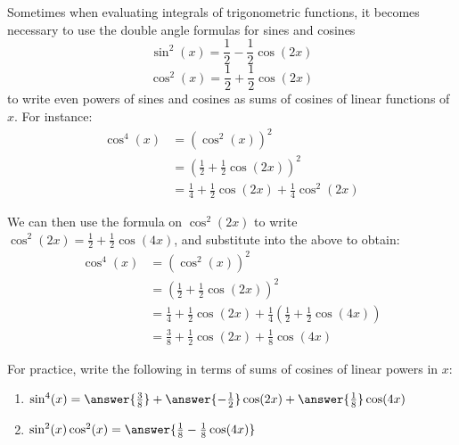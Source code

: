 \documentclass{ximera}
\begin{document}
\begin{exercise}
\begin{problem}

  Sometimes when evaluating integrals of trigonometric functions, it becomes necessary to use the double angle formulas for sines and cosines
  \[
    \sin^2(x) = \frac{1}{2} - \frac{1}{2}\cos(2x)
  \]
  \[
    \cos^2(x) = \frac{1}{2} + \frac{1}{2}\cos(2x)
  \]
  to write even powers of sines and cosines as sums of cosines of linear functions of $x$.
  For instance:
  \begin{align*}
    \cos^4(x) &= (\cos^2(x))^2 \\
    &= \left(\frac{1}{2} + \frac{1}{2}\cos(2x)\right)^2 \\
    &= \frac{1}{4} + \frac{1}{2}\cos(2x) + \frac{1}{4}\cos^2(2x)
  \end{align*}
  
  We can then use the formula on $\cos^2(2x)$ to write $\cos^2(2x) = \frac{1}{2} + \frac{1}{2}\cos(4x)$, and substitute into the above to obtain:
  \begin{align*}
    \cos^4(x) &= (\cos^2(x))^2\\
    &= \left(\frac{1}{2} + \frac{1}{2}\cos(2x)\right)^2 \\
    &= \frac{1}{4} + \frac{1}{2}\cos(2x) + \frac{1}{4}\left( \frac{1}{2} + \frac{1}{2}\cos(4x)\right) \\
    &= \frac{3}{8} + \frac{1}{2}\cos(2x) + \frac{1}{8}\cos(4x)
  \end{align*}
  





  For practice, write the following in terms of sums of cosines of
  linear powers in $x$:


  
  \begin{enumerate}
    \item $\sin^4(x) = \answer{\frac{3}{8}} +\answer{- \frac{1}{2}}\cos(2x) + \answer{\frac{1}{8}}\cos(4x)$

    \item $\sin^2(x)\cos^2(x) = \answer{\frac{1}{8} - \frac{1}{8}\cos(4x)}$
  \end{enumerate}
\end{problem}

\end{exercise}
\end{document}
